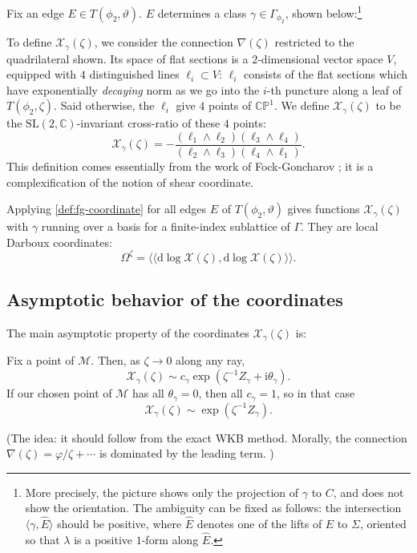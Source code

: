 \documentclass[12pt,letterpaper,reqno]{article}
\numberwithin{equation}{section}
\newcommand{\cM}{\ensuremath{\mathcal M}}
\newcommand{\cX}{\ensuremath{\mathcal X}}
\newcommand{\C}{\ensuremath{\mathbb C}}
\newcommand{\PP}{\ensuremath{\mathbb P}}
\newcommand{\I}{{\mathrm i}}
\newcommand{\de}{\mathrm{d}}
\newcommand{\IP}[1]{\langle#1\rangle}
\newcommand{\DIP}[1]{\langle\!\langle#1\rangle\!\rangle}
\newcommand{\ti}[1]{\textit{#1}}
\newcommand{\SL}{\mathrm{SL}}
\newcommand{\insfig}[2]{

\medskip
\noindent
\begin{minipage}{\linewidth}

\makebox[\linewidth]{\texttt{[image: figures/\#1-crop.pdf]}}

\end{minipage}
\medskip

}
\newcommand{\fixme}[1]{{\color{orange}{[#1]}}}
\begin{document}
\begin{defn} \label{def:fg-coordinate}
Fix an edge $E \in T(\phi_2,\vartheta)$.
$E$ determines a class $\gamma \in \Gamma_{\phi_2}$, shown
below:\footnote{More precisely, the picture shows
only the projection of $\gamma$ to $C$, and does not show
the orientation. The ambiguity can be fixed as follows:
the intersection $\IP{\gamma,\hat E}$ should be positive,
where $\hat E$ denotes one of the lifts of $E$ to $\Sigma$,
oriented so that $\lambda$ is a positive $1$-form
along $\hat E$.}
\insfig{higgs-metric-10}{1.3}
To define $\cX_\gamma(\zeta)$, we consider the connection
$\nabla(\zeta)$ restricted to the quadrilateral shown.
Its space of flat sections is a $2$-dimensional vector space $V$,
equipped with $4$ distinguished lines $\ell_i \subset V$:
$\ell_i$ consists of the flat sections
which have exponentially \ti{decaying} norm 
as we go into the $i$-th 
puncture along a leaf of $T(\phi_2,\zeta)$.
Said otherwise, the $\ell_i$ give $4$ points of $\C\PP^1$.
We define $\cX_\gamma(\zeta)$ to be the
$\SL(2,\C)$-invariant cross-ratio of these $4$ points:
\begin{equation}
	\cX_\gamma(\zeta) = - \frac{(\ell_1 \wedge \ell_2)(\ell_3 \wedge \ell_4)}{(\ell_2 \wedge \ell_3) (\ell_4 \wedge \ell_1)} .
\end{equation}
This definition comes essentially from
the work of Fock-Goncharov \cite{MR2233852}; it is a complexification of the notion of shear coordinate.
\end{defn}

Applying \autoref{def:fg-coordinate} for all edges $E$
of $T(\phi_2,\vartheta)$ gives functions
$\cX_\gamma(\zeta)$ with $\gamma$ running over a basis for
a finite-index sublattice of $\Gamma$. They are local
Darboux coordinates:
\begin{equation}
  \Omega^\zeta = \DIP{\de \log \cX(\zeta), \de \log \cX(\zeta)}.
\end{equation}

\subsection{Asymptotic behavior of the coordinates}

The main asymptotic property of the coordinates $\cX_\gamma(\zeta)$ is:
\begin{conj}
Fix a point of $\cM$.
Then, as $\zeta \to 0$ along any ray,
\begin{equation}
  \cX_\gamma(\zeta) \sim c_\gamma \exp \left(\zeta^{-1} Z_\gamma + \I \theta_\gamma \right).
\end{equation}
If our chosen point of $\cM$ has all 
$\theta_\gamma = 0$, then all $c_\gamma = 1$, so in that case
\begin{equation}
  \cX_\gamma(\zeta) \sim \exp \left(\zeta^{-1} Z_\gamma\right).
\end{equation}
\end{conj}
(The idea: it should follow from the exact WKB method. Morally,
the connection $\nabla(\zeta) = \varphi / \zeta + \cdots$ 
is dominated by the leading term. \fixme{explain a little more?})
\end{document}
